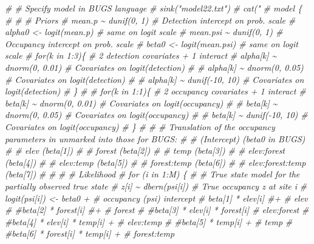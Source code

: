 \documentclass[
]{book}
\newenvironment{Shaded}{\begin{snugshade}}{\end{snugshade}}
\newcommand{\CommentTok}[1]{\textcolor[rgb]{0.56,0.35,0.01}{\textit{#1}}}
\begin{document}
\begin{Shaded}
\begin{Highlighting}[]
\CommentTok{\# \# Specify model in BUGS language}
\CommentTok{\# sink("model22.txt")}
\CommentTok{\# cat("}
\CommentTok{\# model \{}
\CommentTok{\# }
\CommentTok{\# \# Priors}
\CommentTok{\# mean.p \textasciitilde{} dunif(0, 1)        \# Detection intercept on prob. scale}
\CommentTok{\# alpha0 \textless{}{-} logit(mean.p)     \# same on logit scale}
\CommentTok{\# mean.psi \textasciitilde{} dunif(0, 1)      \# Occupancy intercept on prob. scale}
\CommentTok{\# beta0 \textless{}{-} logit(mean.psi)    \# same on logit scale}
\CommentTok{\# for(k in 1:3)\{              \# 2 detection covariates + 1 interact}
\CommentTok{\#     alpha[k] \textasciitilde{} dnorm(0, 0.01) \# Covariates on logit(detection)}
\CommentTok{\# \#   alpha[k] \textasciitilde{} dnorm(0, 0.05) \# Covariates on logit(detection)}
\CommentTok{\# \#   alpha[k] \textasciitilde{} dunif({-}10, 10) \# Covariates on logit(detection)}
\CommentTok{\# \}}
\CommentTok{\# }
\CommentTok{\# for(k in 1:1)\{                \# 2 occupancy covariates + 1 interact}
\CommentTok{\#     beta[k] \textasciitilde{} dnorm(0, 0.01)  \# Covariates on logit(occupancy)}
\CommentTok{\# \#   beta[k] \textasciitilde{} dnorm(0, 0.05)  \# Covariates on logit(occupancy)}
\CommentTok{\# \#   beta[k] \textasciitilde{} dunif({-}10, 10)  \# Covariates on logit(occupancy)}
\CommentTok{\# \}}
\CommentTok{\# }
\CommentTok{\# \# Translation of the occupancy parameters in unmarked into those for BUGS:}
\CommentTok{\# \# (Intercept)         (beta0 in BUGS)}
\CommentTok{\# \# elev                (beta[1])}
\CommentTok{\# \# forest              (beta[2])}
\CommentTok{\# \# temp                (beta[3])}
\CommentTok{\# \# elev:forest         (beta[4])}
\CommentTok{\# \# elev:temp           (beta[5])}
\CommentTok{\# \# forest:temp         (beta[6])}
\CommentTok{\# \# elev:forest:temp    (beta[7])}
\CommentTok{\# }
\CommentTok{\# }
\CommentTok{\# \# Likelihood}
\CommentTok{\# for (i in 1:M) \{}
\CommentTok{\#   \# True state model for the partially observed true state}
\CommentTok{\#   z[i] \textasciitilde{} dbern(psi[i])                      \# True occupancy z at site i}
\CommentTok{\#   logit(psi[i]) \textless{}{-} beta0 +                  \# occupancy (psi) intercept}
\CommentTok{\#     beta[1] * elev[i] \#+                     \# elev}
\CommentTok{\#     \#beta[2] * forest[i] \#+                  \# forest}
\CommentTok{\#     \#beta[3] * elev[i] * forest[i]          \# elev:forest}
\CommentTok{\#     \#beta[4] * elev[i] * temp[i] +          \# elev:temp}
\CommentTok{\#     \#beta[5] * temp[i] +                    \# temp}
\CommentTok{\#     \#beta[6] * forest[i] * temp[i] +        \# forest:temp}

\end{Highlighting}
\end{Shaded}
\end{document}
